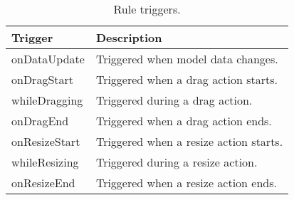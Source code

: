  

\begin{table}[b!]
\centering
\caption{Rule triggers.}
\label{tab:trigger}
\begin{tabular}{|p{2cm}|p{6cm}|}\hline
\textbf{Trigger} & \textbf{Description}\\\hline
{onDataUpdate} & Triggered when model data changes.\\\hline
{onDragStart} & Triggered when a drag action starts.\\\hline
{whileDragging} & Triggered during a drag action.\\\hline
{onDragEnd} & Triggered when a drag action ends.\\\hline
{onResizeStart} & Triggered when a resize action starts.\\\hline
{whileResizing} & Triggered during a resize action.\\\hline
{onResizeEnd} & Triggered when a resize action ends.\\\hline
\end{tabular}
\end{table}  
